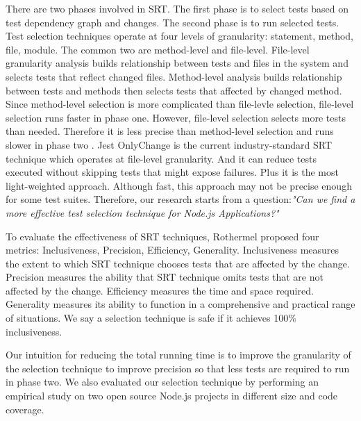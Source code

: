 \documentclass[10pt, conference]{IEEEtran}
\begin{document}
There are two phases involved in SRT. The first phase is to select tests based on  
test dependency graph and changes. The second phase is to run selected tests.
Test selection techniques operate at four levels of granularity: statement, method, file, module. The common 
two are method-level and file-level. File-level granularity analysis builds relationship between tests and files in 
the system and selects tests that reflect changed files. Method-level analysis builds relationship between tests and methods 
then selects tests that affected by changed method. Since method-level selection is more complicated than  
file-levle selection, file-level selection runs faster in phase one. However, file-level selection selects more 
tests than needed. Therefore it is less precise than method-level selection and runs slower in phase two \cite{b6}.
Jest OnlyChange is the current industry-standard SRT technique which operates at file-level granularity. And it can reduce tests executed 
without skipping tests that might expose failures. Plus it is the most light-weighted approach. Although fast, this approach may not be precise 
enough for some test suites. Therefore, our research starts from a question:\textit{"Can we find a more 
effective test selection technique for Node.js Applications?"} 

To evaluate the effectiveness of SRT techniques, Rothermel\cite{b13} proposed four metrics: Inclusiveness, Precision, Efficiency, Generality. Inclusiveness 
measures the extent to which SRT technique chooses tests that are affected by the change. Precision measures 
the ability that SRT technique omits tests that are not affected by the change. Efficiency measures the time and 
space required. Generality measures its ability to function in a comprehensive and practical range of situations.
We say a selection technique is safe if it achieves 100\% inclusiveness.

Our intuition for reducing the total running time is to 
improve the granularity of the selection technique to improve precision so that less tests are required to run in phase two. 
We also evaluated our selection technique by performing an empirical study on two open source Node.js projects in different 
size and code coverage.
\end{document}
